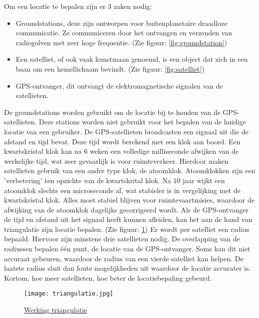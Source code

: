 Om een locatie te bepalen zijn er 3 zaken nodig:
\begin{itemize}
	\item Groundstations, deze zijn ontworpen voor buitenplanetaire draadloze communicatie. Ze communiceren door het ontvangen en verzenden van radiogolven met zeer hoge frequentie. (Zie figuur: \ref{fig:groundstation})
	\item Een satelliet, of ook vaak kunstmaan genoemd, is een object dat zich in een baan om een hemellichaam bevindt. \autocite{definitie_satelliet} (Zie figuur: \ref{fig:satelliet})
	\item GPS-ontvanger, dit ontvangt de elektromagnetische signalen van de satellieten.
\end{itemize}

De groundstations worden gebruikt om de locatie bij te houden van de GPS-satellieten. Deze stations worden niet gebruikt voor het bepalen van de huidige locatie van een gebruiker. 
\newline
\newline
De GPS-satellieten broadcasten een signaal uit die de afstand en tijd bevat. Deze tijd wordt berekend met een klok aan boord. Een kwartskristal klok kan na 6 weken een volledige milliseconde afwijken van de werkelijke tijd, wat zeer gevaarlijk is voor ruimteverkeer. Hierdoor maken satellieten gebruik van een ander type klok, de atoomklok. Atoomklokken zijn een 'verbetering' ten opzichte van de kwartskrital klok.  Na 10 jaar wijkt een atoomklok slechts een microseconde af, wat stabieler is in vergelijking met de kwartskristal klok. Alles moet stabiel blijven voor ruimtevaartmisies, waardoor de afwijking van de atoomklok dagelijks gecorrigeerd wordt. \autocite{atomic_clock}
\newline
Als de GPS-ontvanger de tijd en afstand uit het signaal heeft kunnen afleiden, kan het aan de hand van triangulatie zijn locatie bepalen. (Zie figuur: \ref{fig:triangulatie})
Er wordt per satelliet een radius bepaald. Hiervoor zijn minstens drie satellieten nodig. De overlapping van de radiussen bepalen één punt, de locatie van de GPS-ontvanger. Soms kan dit niet accuraat gebeuren, waardoor de radius van een vierde satelliet kan helpen. De laatste radius sluit dan foute mogelijkheden uit waardoor de locatie accurater is. Kortom, hoe meer satellieten, hoe beter de locatiebepaling gebeurd. 

\begin{figure}
	\texttt{[image: triangulatie.jpg]}
	\caption{\href{https://communicatiekc.com/triangulatie/}{Werking triangulatie}}
	\label{fig:triangulatie}
\end{figure} 
\pagebreak
